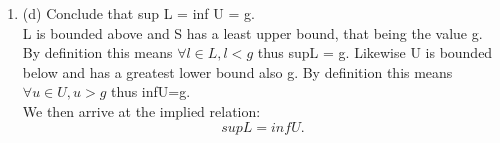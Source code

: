 \documentclass[11pt]{article}
\theoremstyle{definition}  %
\begin{document}
\begin{enumerate}
  \item (d) Conclude that sup L = inf U = g.\\
  L is bounded above and S has a least upper bound, that being the value g. By definition this means
  $\forall l\in L, l <g$ thus supL = g.
  Likewise U is bounded below and has a greatest lower bound also g. By definition this means
  $\forall u\in U, u>g$ thus infU=g. \\
  We then arrive at the implied relation:
  \[
    supL=infU.
  \]

\end{enumerate}
\end{document}
